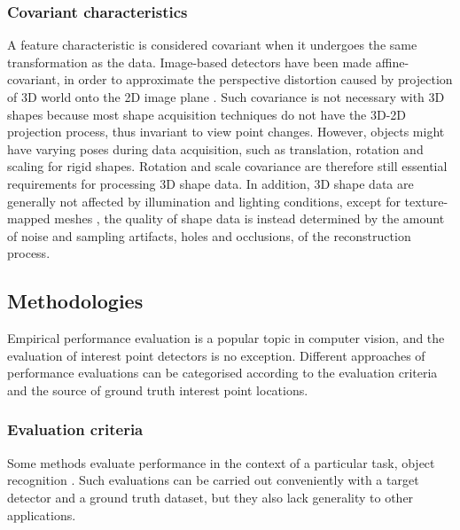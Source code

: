 \subsubsection{Covariant characteristics}

A feature characteristic is considered covariant when it undergoes the same transformation as the data. 
Image-based detectors have been made affine-covariant, in order to approximate the perspective distortion caused by projection of 3D world onto the 2D image plane \cite{Mikolajczyk2002}. 
Such covariance is not necessary with 3D shapes because most shape acquisition techniques do not have the 3D-2D projection process, thus invariant to view point changes. 
However, objects might have varying poses during data acquisition, such as translation, rotation and scaling for rigid shapes. Rotation and scale covariance are therefore still essential requirements for processing 3D shape data. 
In addition, 3D shape data are generally not affected by illumination and lighting conditions, except for texture-mapped meshes \cite{Zaharescu2009}, the quality of shape data is instead determined by the amount of noise and sampling artifacts, \eg holes and occlusions, of the reconstruction process. 

\subsection{Methodologies}

Empirical performance evaluation is a popular topic in computer vision, and the evaluation of interest point detectors is no exception. Different approaches of performance evaluations can be categorised according to the evaluation criteria and the source of ground truth interest point locations. 

\subsubsection{Evaluation criteria}

Some methods evaluate performance in the context of a particular task, \eg object recognition \cite{Shin1999, Dutagaci2011}. Such evaluations can be carried out conveniently with a target detector and a ground truth dataset, but they also lack generality to other applications. 

